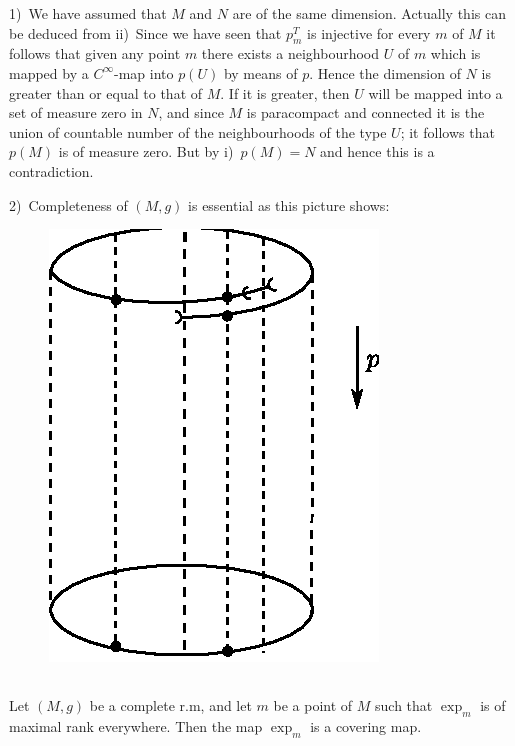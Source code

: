 \begin{remarks*}
1)~We have assumed that $M$ and $N$ are of the same
dimension. Actually this can be deduced from ii)~Since we have
seen \pageoriginale that $p^{T}_{m}$ is injective for every $m$ of $M$
it follows that given any point $m$ there exists a neighbourhood $U$
of $m$ which is mapped by a $C^{\infty}$-map into $p(U)$ by means of
$p$. Hence the dimension of $N$ is greater than or equal to that of
$M$. If it is greater, then $U$ will be mapped into a set of measure
zero in $N$, and since $M$ is paracompact and connected it is the
union of countable number of the neighbourhoods of the type $U$; it
follows that $p(M)$ is of measure zero. But by i)~$p(M)=N$ and hence
this is a contradiction.

2)~Completeness of $(M,g)$ is essential as this picture shows:
\begin{figure}[H]
\centering
\includegraphics{figures/chap7-fig9.eps}
\end{figure}
\end{remarks*}

\subsection{}\label{chap7:7.5.3}

\begin{prop*}
Let $(M,g)$ be a complete r.m, and let $m$ be a point of $M$ such that
$\exp_{m}$ is of maximal rank everywhere. Then the map $\exp_{m}$ is a
covering map.
\end{prop*}

